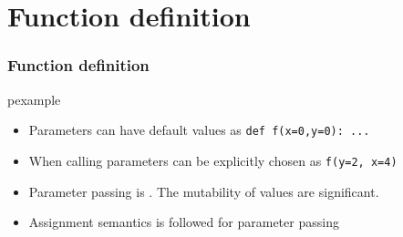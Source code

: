 \documentclass[trans,compress,xcolor=table]{beamer}
\begin{document}
\section{Function definition}
\begin{frame}
\frametitle{Function definition}
\begin{beamercolorbox}{pexample}
\codefunction
\end{beamercolorbox}

\begin{itemize}
\item Parameters can have default values as \lstinline!def f(x=0,y=0): ...!
\item When calling parameters can be explicitly chosen as \lstinline!f(y=2, x=4)!
\item Parameter passing is . The mutability of
      values are significant.
\item Assignment semantics is followed for parameter passing
\end{itemize}
\end{frame}
\end{document}
